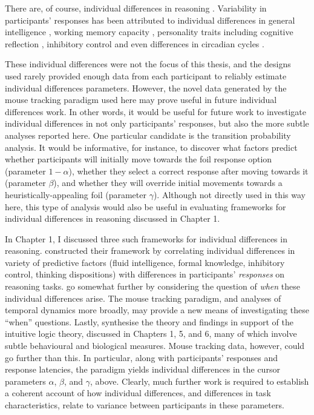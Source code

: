 There are, of course, individual differences in reasoning
\citep[see, e.g.,][]{Stanovich2000,DeNeys2005,Frederick2005,Feeney2007a}.
Variability in participants' responses has been attributed to
individual differences in general intelligence \citep{Stanovich2000},
working memory capacity \citep{DeNeys2005},
personality traits \citep{Cokely2012,Cacioppo1982}
including cognitive reflection \citep{Frederick2005,Stanovich2009a,Stanovich2009},
inhibitory control \citep{Bright,Markovits2004}
and even differences in circadian cycles
\citep[i.e. \emph{morning people} are more rational in the morning;][]{Wieth2011}.

These individual differences  were not the focus of this thesis,
and the designs used rarely provided enough data from each participant
to reliably estimate individual differences parameters.
However, the novel data generated by the mouse tracking paradigm used here
may prove useful in future individual differences work.
In other words, it would be useful for future work
to investigate individual differences in not only participants' responses,
but also the more subtle analyses reported here.
One particular candidate is the transition probability analysis.
It would be informative, for instance,
to discover what factors predict whether participants will
initially move towards the foil response option (parameter $1 - \alpha$),
whether they select a correct response after moving towards it (parameter $\beta$),
and whether they will override initial movements
towards a heuristically-appealing foil (parameter $\gamma$).
Although not directly used in this way here,
this type of analysis would also be useful
in evaluating frameworks for individual differences in reasoning
discussed in Chapter 1.

In Chapter 1, I discussed three such frameworks
for individual differences in reasoning.
\citet{Stanovich2008} constructed their framework
by correlating individual differences in variety of predictive factors
(fluid intelligence, formal knowledge, inhibitory control, thinking dispositions)
with differences  in participants' \emph{responses} on reasoning tasks.
\citet{DeNeys2013} go somewhat further by considering the question of
\emph{when} these individual differences arise.
The mouse tracking paradigm,
and analyses of temporal dynamics more broadly,
may provide a new means of investigating these ``when'' questions.
Lastly, \citet{Pennycook2015} synthesise the theory
and findings in support of the intuitive logic theory,
discussed in Chapters 1, 5, and 6,
many of which involve subtle behavioural and biological measures.
Mouse tracking data, however, could go further than this.
In particular, along with participants' responses and response latencies,
the paradigm yields individual differences in the cursor parameters
$\alpha$, $\beta$, and $\gamma$, above.
Clearly, much further work is required
to establish a coherent account of how individual differences,
and differences in task characteristics,
relate to variance between participants in these parameters.

